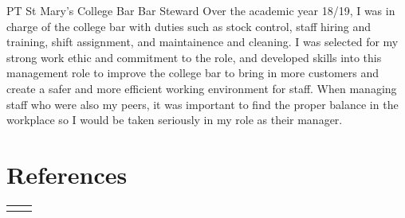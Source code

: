 \documentclass[10pt]{article} %
\begin{document}
\begin{paracol}{2}

{PT} %
{St Mary's College Bar} %
{Bar Steward} %
{Over the academic year 18/19, I was in charge of the college bar with duties such as stock control, staff hiring and training, shift assignment, and maintainence and cleaning. I was selected for my strong work ethic and commitment to the role, and developed skills into this management role to improve the college bar to bring in more customers and create a safer and more efficient working environment for staff. When managing staff who were also my peers, it was important to find the proper balance in the workplace so I would be taken seriously in my role as their manager.} %



\section{References}







\begin{supertabular}{rl} %
	
	


\end{supertabular}
\end{paracol}
\end{document}
